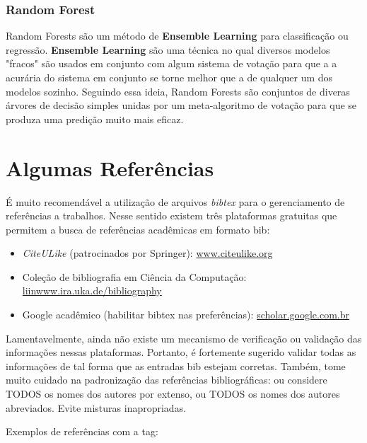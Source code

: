\subsubsection{Random Forest}

Random Forests são um método de \textbf{Ensemble Learning} para classificação ou regressão. \textbf{Ensemble Learning} são uma técnica no qual diversos modelos "fracos" são usados em conjunto com algum sistema de votação para que a a acurária do sistema em conjunto se torne melhor que a de qualquer um dos modelos sozinho. Seguindo essa ideia, Random Forests são conjuntos de diveras árvores de decisão simples unidas por um meta-algoritmo de votação para que se produza uma predição muito mais eficaz.



\section{Algumas Referências}
\label{sec:algumas_referencias}

É muito recomendável a utilização de arquivos \emph{bibtex} para o gerenciamento
de referências a trabalhos. Nesse sentido existem três plataformas gratuitas
que permitem a busca de referências acadêmicas em formato bib: 
\begin{itemize}
	\item \emph{CiteULike} (patrocinados por Springer): \url{www.citeulike.org}
	\item Coleção de bibliografia em Ciência da Computação: \url{liinwww.ira.uka.de/bibliography}
	\item Google acadêmico (habilitar bibtex nas preferências): \url{scholar.google.com.br}
\end{itemize}
Lamentavelmente, ainda não existe um mecanismo de verificação ou validação das
informações nessas plataformas. Portanto, é fortemente sugerido validar todas
as informações de tal forma que as entradas bib estejam corretas.  Também, tome
muito cuidado na padronização das referências bibliográficas: ou considere TODOS
os nomes dos autores por extenso, ou TODOS os nomes dos autores abreviados.
Evite misturas inapropriadas.

Exemplos de referências com a tag:
